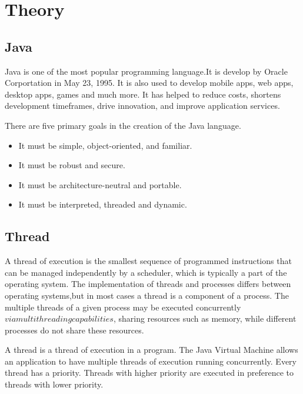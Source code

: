 \chapter{Theory}
     
    \section{Java}
    Java is one of the most popular programming language.It is develop by Oracle Corportation
    in May 23, 1995. It is also used to develop mobile apps, web apps, desktop apps, games and
    much more. It has helped to reduce costs, shortens development timeframes, drive innovation,
    and improve application services.
      \medskip

     \noindent
     There are five primary goals in the creation of the Java language.
     \begin{itemize}
        \item It must be simple, object-oriented, and familiar.
        \item It must be robust and secure.
        \item It must be architecture-neutral and portable.
        \item It must be interpreted, threaded and dynamic.
    \end{itemize}

    \section{Thread}
    A thread of execution is the smallest sequence of programmed instructions that can be managed 
    independently by a scheduler, which is typically a part of the operating system.
    The implementation of threads and processes differs between operating systems,but in most cases
    a thread is a component  of a process. The multiple threads of a given process may be executed
    concurrently \(via multithreading capabilities\), sharing resources such as memory, while different
    processes do not share these resources.
    \medskip

	\noindent
    A thread is a thread of execution in a program. The Java Virtual Machine allows an application to have
    multiple threads of execution running concurrently. Every thread has a priority. Threads with higher 
    priority are executed in preference to threads with lower priority.

